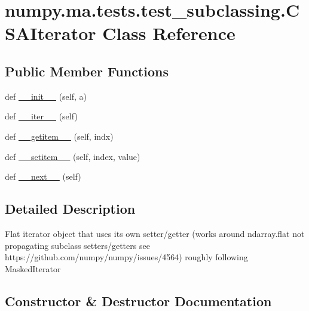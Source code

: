 \hypertarget{classnumpy_1_1ma_1_1tests_1_1test__subclassing_1_1CSAIterator}{}\section{numpy.\+ma.\+tests.\+test\+\_\+subclassing.\+C\+S\+A\+Iterator Class Reference}
\label{classnumpy_1_1ma_1_1tests_1_1test__subclassing_1_1CSAIterator}
\subsection*{Public Member Functions}
\begin{DoxyCompactItemize}
\item 
def \hyperlink{classnumpy_1_1ma_1_1tests_1_1test__subclassing_1_1CSAIterator_a1e7b752a398245f30ce94318b5248c1a}{\+\_\+\+\_\+init\+\_\+\+\_\+} (self, a)
\item 
def \hyperlink{classnumpy_1_1ma_1_1tests_1_1test__subclassing_1_1CSAIterator_af7066aed99155a047e350a3de143c7f0}{\+\_\+\+\_\+iter\+\_\+\+\_\+} (self)
\item 
def \hyperlink{classnumpy_1_1ma_1_1tests_1_1test__subclassing_1_1CSAIterator_aeef6b42f015455bdd87057e9c468207e}{\+\_\+\+\_\+getitem\+\_\+\+\_\+} (self, indx)
\item 
def \hyperlink{classnumpy_1_1ma_1_1tests_1_1test__subclassing_1_1CSAIterator_abc3f90e7b2a90fce3623ff3c10fda8f9}{\+\_\+\+\_\+setitem\+\_\+\+\_\+} (self, index, value)
\item 
def \hyperlink{classnumpy_1_1ma_1_1tests_1_1test__subclassing_1_1CSAIterator_a3a11b2c81628fd35d79d66d222cfb00d}{\+\_\+\+\_\+next\+\_\+\+\_\+} (self)
\end{DoxyCompactItemize}


\subsection{Detailed Description}
\begin{DoxyVerb}Flat iterator object that uses its own setter/getter
(works around ndarray.flat not propagating subclass setters/getters
see https://github.com/numpy/numpy/issues/4564)
roughly following MaskedIterator
\end{DoxyVerb}
 

\subsection{Constructor \& Destructor Documentation}
\mbox{\label{classnumpy_1_1ma_1_1tests_1_1test__subclassing_1_1CSAIterator_a1e7b752a398245f30ce94318b5248c1a}} 
